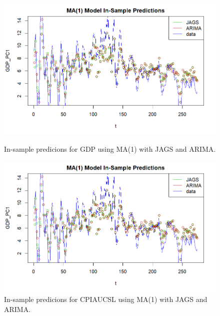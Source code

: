 \begin{figure}[H]
    \centering
    \begin{minipage}{0.49\textwidth}
        \centering
        \includegraphics[width=\textwidth]{images/3-MA/ARIMA_MA1_predictions_gdp.png}
        \caption{In-sample predicions for GDP using MA(1) with JAGS and ARIMA.}
        \label{fig:ARIMA_MA1_gdp_prediction}
    \end{minipage}\hfill
    \begin{minipage}{0.49\textwidth}
        \centering
        \includegraphics[width=\textwidth]{images/3-MA/ARIMA_MA1_predictions_gdp.png}
        \caption{In-sample predicions for CPIAUCSL using MA(1) with JAGS and ARIMA.}
        \label{fig:ARIMA_MA1_infl_prediction}
    \end{minipage}
\end{figure}
